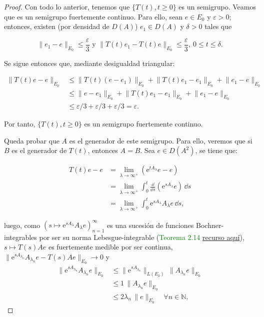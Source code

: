\begin{proof}
    Con todo lo anterior, tenemos que $\{T(t), t \geq 0\}$ es un semigrupo. Veamos que es un semigrupo fuertemente continuo. Para ello, sean $e \in E_0$ y $\varepsilon > 0$; entonces, existen (por densidad de $D(A)$) $e_1 \in D(A)$ y $\delta > 0$ tales que

    \[\lVert e_1 -e\rVert_{E_0} \leq \frac{\varepsilon}{3} \text{ y } \lVert T(t)e_1 -T(t)e\rVert_{E_0} \leq \frac{\varepsilon}{3}, \ 0 \leq t \leq \delta.\]

    Se sigue entonces que, mediante desigualdad triangular:

    \begin{align*}
        \lVert T(t)e - e\rVert_{E_0} &\leq \lVert T(t)(e-e_1)\rVert_{E_0} + \lVert T(t)e_1 - e_1\rVert_{E_0} + \lVert e_1 - e \rVert_{E_0}\\
        &\leq \lVert e - e_1 \rVert_{E_0} +  \lVert T(t)e_1 - e_1\rVert_{E_0} + \lVert e_1 - e \rVert_{E_0}\\
        &\leq \varepsilon/3 + \varepsilon/3 + \varepsilon/3 = \varepsilon.
    \end{align*}

    Por tanto, $\{T(t), t \geq 0\}$ es un semigrupo fuertemente continuo.

    Queda probar que $A$ es el generador de este semigrupo. Para ello, veremos que si $B$ es el generador de $T(t)$, entonces $A = B$. Sea $e \in D(A^2)$, se tiene que:

    \begin{align*}
        T(t)e - e &= \lim_{\lambda \rightarrow \infty^+}(\mathrm{e}^{tA_\lambda}e - e)\\
        &= \lim_{\lambda \rightarrow \infty^+} \int_0^t \frac{\dd}{\dd s} (\mathrm{e}^{sA_\lambda}e) \, \dd s\\
        &= \lim_{\lambda \rightarrow \infty^+} \int_0^t \mathrm{e}^{sA_\lambda}A_\lambda e \, \dd s,
    \end{align*}

    luego, como $(s \mapsto \mathrm{e}^{sA_\lambda}A_\lambda e)_{n=1}^\infty$ es una sucesión de funciones Bochner-integrables por ser su norma Lebesgue-integrable (\textcolor{green}{Teorema 2.14} \href{http://tesis.uson.mx/digital/tesis/docs/18969/Capitulo2.pdf}{recurso aquí}), $s \mapsto T(s)Ae$ es fuertemente medible por ser continua, $\lVert \mathrm{e}^{sA_{\lambda_n}}A_{\lambda_n}e - T(s)Ae \rVert_{E_0} \rightarrow 0$\footnotemark \text{} y
    \begin{align*}
        \lVert \mathrm{e}^{sA_{\lambda_n}}A_{\lambda_n}e\rVert_{E_0} &\leq  \lVert \mathrm{e}^{sA_{\lambda_n}}\rVert_{L(E_0)} \, \lVert A_{\lambda_n}e\rVert_{E_0}\\
        &\leq 1 \, \lVert A_{\lambda_n}e\rVert_{E_0}\\
        &\leq 2\lambda_n \, \lVert e \rVert_{E_0} \quad \forall n \in \mathbb{N},
    \end{align*}


\end{proof}
